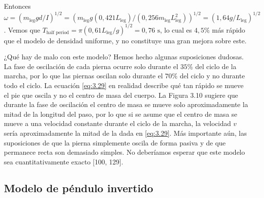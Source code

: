 \documentclass[12pt]{book}
\begin{document}
Entonces $\omega = (m_{\text{leg}} g d / I)^{1/2} = (m_{\text{leg}} g (0,421 L_{\text{leg}})/(0,256 m_{\text{leg}} L_{\text{leg}}^2))^{1/2} = (1,64 g / L_{\text{leg}})^{1/2}$. Vemos que $T_{\text{half period}} = \pi (0,61 L_{\text{leg}} / g)^{1/2} = 0,76\text{ s}$, lo cual es $4,5\%$ más rápido que el modelo de densidad uniforme, y no constituye una gran mejora sobre este.

¿Qué hay de malo con este modelo? Hemos hecho algunas suposiciones dudosas. La fase de oscilación de cada pierna ocurre solo durante el $35\%$ del ciclo de la marcha, por lo que las piernas oscilan solo durante el $70\%$ del ciclo y no durante todo el ciclo. La ecuación \eqref{eq:3.29} en realidad describe qué tan rápido se mueve el pie que oscila y no el centro de masa del cuerpo. La Figura 3.10 sugiere que durante la fase de oscilación el centro de masa se mueve solo aproximadamente la mitad de la longitud del paso, por lo que si se asume que el centro de masa se mueve a una velocidad constante durante el ciclo de la marcha, la velocidad $v$ sería aproximadamente la mitad de la dada en \eqref{eq:3.29}. Más importante aún, las suposiciones de que la pierna simplemente oscila de forma pasiva y de que permanece recta son demasiado simples. No deberíamos esperar que este modelo sea cuantitativamente exacto [100, 129].

\subsection{Modelo de péndulo invertido}
\end{document}
